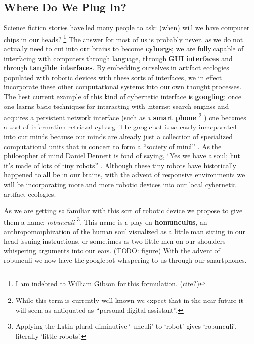 \subsection{Where Do We Plug In?}
%
Science fiction stories have led many people to ask: (when) will we have computer chips in our heads?%
\footnote{I am indebted to William Gibson for this formulation. (cite?)} 
The answer for most of us is probably never, as we do not actually need to cut into our brains to become \textbf{cyborgs}; we are fully capable of interfacing with computers through language, through \textbf{GUI interfaces} and through \textbf{tangible interfaces}.
By embedding ourselves in artifact ecologies populated with robotic devices with these sorts of interfaces, we in effect incorporate these other computational systems into our own thought processes.
The best current example of this kind of cybernetic interface is \textbf{googling}; once one learns basic techniques for interacting with internet search engines and acquires a persistent network interface (such as a \textbf{smart phone}%
\footnote{While this term is currently well known we expect that in the near future it will seem as antiquated as ``personal digital assistant''.}
) one becomes a sort of information-retrieval cyborg.
The googlebot is so easily incorporated into our minds because our minds are already just a collection of specialized computational units that in concert to form a ``society of mind'' \citep{society_of_mind}. 
As the philosopher of mind Daniel Dennett is fond of saying, ``Yes we have a soul; but it's made of lots of tiny robots'' \citeyearpar[][p. 1]{freedom_evolves}. Although these tiny robots have historically happened to all be in our brains, with the advent of responsive environments we will be incorporating more and more robotic devices into our local cybernetic artifact ecologies.

As we are getting so familiar with this sort of robotic device we propose to give them a name: \emph{robunculi}%
\footnote{Applying the Latin plural diminutive `-unculi' to `robot' gives `robunculi', literally `little robots'.}.
This name is a play on \textbf{homunculus}, an anthropomorphization of the human soul visualized as a little man sitting in our head issuing instructions, or sometimes as two little men on our shoulders whispering arguments into our ears.
(TODO: figure)
With the advent of robunculi we now have the googlebot whispering to us through our smartphones.

